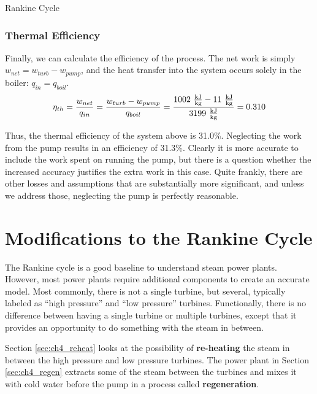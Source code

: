 \begin{example}[label=ex:RankineCycle]{Rankine Cycle}
  \subsubsection*{Thermal Efficiency}

  Finally, we can calculate the efficiency of the process.  The net work is simply $w_{net} = w_{turb} - w_{pump}$, and the heat transfer into the system occurs solely in the boiler: $q_{in} = q_{boil}$.
  \begin{equation*}
    \eta_{th} = \frac{w_{net}}{q_{in}} = \frac{w_{turb}-w_{pump}}{q_{boil}}=\frac{1002\ \rm\frac{kJ}{kg} - 11\ \rm\frac{kJ}{kg}}{3199\ \rm\frac{kJ}{kg}} = 0.310
  \end{equation*}

  Thus, the thermal efficiency of the system above is 31.0\%.  Neglecting the work from the pump results in an efficiency of 31.3\%.  Clearly it is more accurate to include the work spent on running the pump, but there is a question whether the increased accuracy justifies the extra work in this case.  Quite frankly, there are other losses and assumptions that are substantially more significant, and unless we address those, neglecting the pump is perfectly reasonable.
  
\end{example}

\section{Modifications to the Rankine Cycle}
The Rankine cycle is a good baseline to understand steam power plants.  However, most power plants require additional components to create an accurate model.  Most commonly, there is not a single turbine, but several, typically labeled as ``high pressure'' and ``low pressure'' turbines.  Functionally, there is no difference between having a single turbine or multiple turbines, except that it provides an opportunity to do something with the steam in between.

Section \ref{sec:ch4_reheat} looks at the possibility of {\bf re-heating} the steam in between the high pressure and low pressure turbines.  The power plant in Section \ref{sec:ch4_regen} extracts some of the steam between the turbines and mixes it with cold water before the pump in a process called {\bf regeneration}.

